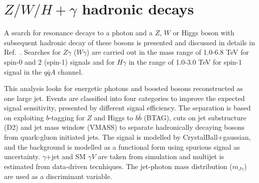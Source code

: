 \documentclass{PoS}
\begin{document}
\vspace*{-4mm}
\section{$Z/W/H+\gamma$ hadronic decays}
\label{sec:gV}
\vspace*{-2mm}
A search for resonance decays to a photon and a $Z$, $W$ or Higgs boson with subsequent hadronic decay of these bosons is presented and discussed in details in Ref.~\cite{EXOT-2016-30}. 
Searches for $Z\gamma$ ($W\gamma$) are carried out in the mass range of 1.0-6.8 TeV for spin-0 and 2 (spin-1) signals and for $H\gamma$ in the range of 1.0-3.0 TeV for spin-1 signal in the $q\bar{q}A$ channel.

This analysis looks for energetic photons and boosted bosons reconstructed as one large jet.
Events are classified into four categories to improve the expected signal sensitivity, presented by different signal efficiency. 
The separation is based on exploiting $b$-tagging for $Z$ and Higgs to $b\bar{b}$ (BTAG), cuts on jet substructure (D2) and jet mass window (VMASS) to separate hadronically decaying bosons from quark-gluon initiated jets.
The signal is modelled by CrystalBall+gaussian, and the background is modelled as a functional form using spurious signal as uncertainty. $\gamma$+jet and SM $\gamma V$ are taken from simulation and multijet is estimated from data-driven tecnhiques.
The jet-photon mass distribution ($m_{J \gamma}$) are used as a discriminant variable. %
\end{document}
